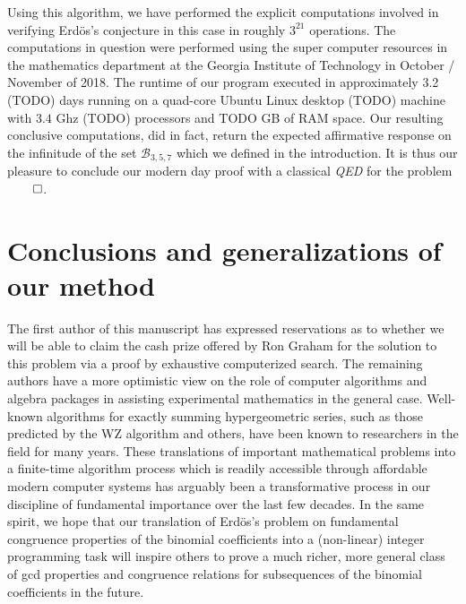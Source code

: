 \documentclass[12pt]{article}
\begin{document}
Using this algorithm, 
we have performed the explicit computations involved in verifying Erd\"os's conjecture in this case in 
roughly $3^{21}$ operations. The computations in question were performed using the 
super computer resources in the mathematics department at the Georgia Institute of Technology in 
October / November of 2018. The runtime of our program executed in approximately 3.2 (TODO) days 
running on a quad-core Ubuntu Linux desktop (TODO) machine with $3.4$ Ghz (TODO) processors and 
TODO GB of RAM space. Our resulting 
conclusive computations, did in fact, return the expected affirmative response on the infinitude of the 
set $\mathcal{B}_{3,5,7}$ which we defined in the introduction. It is thus our pleasure to conclude our 
modern day proof with a classical \emph{QED} for the problem $\qed$. 

\section{Conclusions and generalizations of our method} 

The first author of this manuscript has expressed reservations as to whether we will be able to 
claim the cash prize offered by Ron Graham for the solution to this problem via a proof by 
exhaustive computerized search. The remaining authors have a more optimistic view on the role 
of computer algorithms and algebra packages in assisting experimental mathematics in the 
general case. Well-known algorithms for exactly summing hypergeometric series, such as those 
predicted by the WZ algorithm and others, have been known to researchers in the field for many years. 
These translations of important mathematical problems into a finite-time algorithm process which is 
readily accessible through affordable modern computer systems has arguably been a transformative 
process in our discipline of fundamental importance over the last few decades. In the same spirit, 
we hope that our translation of Erd\"os's problem on fundamental congruence properties of the 
binomial coefficients into a (non-linear) integer programming task will inspire others to prove a 
much richer, more general class of gcd properties and congruence relations for subsequences of the 
binomial coefficients in the future. 
\end{document}
